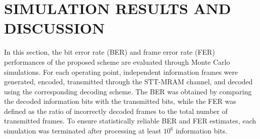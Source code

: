 \documentclass[conference]{IEEEtran}
\begin{document}









\section{SIMULATION RESULTS AND DISCUSSION} \label{section_simulation}

In this section, the bit error rate (BER) and frame error rate (FER) performances of the proposed scheme are evaluated through Monte Carlo simulations. For each operating point, independent information frames were generated, encoded, transmitted through the STT-MRAM channel, and decoded using the corresponding decoding scheme. The BER was obtained by comparing the decoded information bits with the transmitted bits, while the FER was defined as the ratio of incorrectly decoded frames to the total number of transmitted frames. To ensure statistically reliable BER and FER estimates, each simulation was terminated after processing at least $10^6$ information bits.
\end{document}
